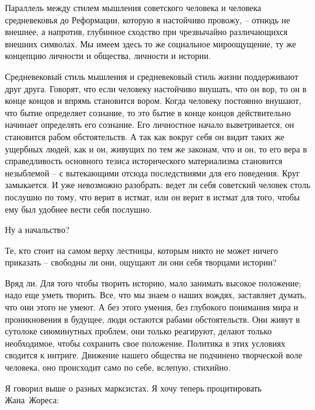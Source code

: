 \documentclass{book}
\begin{document}
Параллель между стилем мышления советского человека и человека средневековья до Реформации, которую я настойчиво провожу, -- 
отнюдь не внешнее, а напротив, глубинное сходст­во при чрезвычайно различающихся внешних символах. Мы имеем здесь то же 
социальное мироощущение, ту же концепцию личности и общества, личности и истории.

Средневековый стиль мышления и средневековый стиль жизни поддерживают друг друга. Говорят, что если человеку настойчиво внушать, 
что он вор, то он в конце концов и впрямь становится вором. Когда человеку постоянно внушают, что бытие определяет сознание, то 
это бытие в конце концов действительно начинает определять его сознание. Его личностное начало выветривается, он становится 
рабом обстоятельств. А так как вокруг себя он видит таких же ущербных людей, как и он, живущих по тем же законам, что и он, то 
его вера в справедливость основного тезиса исторического материализма становится незыблемой -- с вытекающими отсюда 
последствиями для его поведения. Круг замыкается. И уже невозможно разобрать: ведет ли себя советский человек столь послушно по­
тому, что верит в истмат, или он верит в истмат для того, чтобы ему был удобнее вести себя послушно.

Ну а начальство?

Те, кто стоит на самом верху лестницы, которым никто не может ничего приказать -- свободны ли они, ощущают ли они себя творцами 
истории?

Вряд ли. Для того чтобы творить историю, мало занимать высокое положение; надо еще уметь творить.  Все, что мы знаем о наших 
вождях, заставляет думать, что они этого не умеют. А без этого умения, без глубокого понимания мира и проник­новения в будущее, 
люди остаются рабами обстоятельств. Они живут в сутолоке сиюминутных проблем, они только реаги­руют, делают только необходимое, 
чтобы сохранить свое поло­жение. Политика в этих условиях сводится к интриге. Движе­ние нашего общества не подчинено творческой 
воле человека, оно происходит само по себе, вслепую, стихийно.

Я говорил выше о разных марксистах. Я хочу теперь проци­тировать Жана~Жореса:
\end{document}

